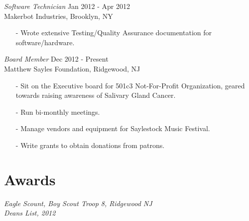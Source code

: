 \documentclass[margin, 10pt]{res} %
\begin{document}
\begin{resume}
{\sl Software Technician} \hfill Jan 2012 - Apr 2012 \\
Makerbot Industries, Brooklyn, NY
\begin{itemize} \itemsep -2pt
\item[-] Wrote extensive Testing/Quality Assurance documentation for software/hardware.
\end{itemize}

{\sl Board Member} \hfill Dec 2012 - Present \\
Matthew Sayles Foundation, Ridgewood, NJ
\begin{itemize} \itemsep -2pt
\item[-] Sit on the Executive board for 501c3 Not-For-Profit Organization, geared towards raising awareness of Salivary Gland Cancer.
\item[-] Run bi-monthly meetings.
\item[-] Manage vendors and equipment for Saylestock Music Festival.
\item[-] Write grants to obtain donations from patrons.
\end{itemize}


\section{Awards} 

{\sl Eagle Scount, Boy Scout Troop 8, Ridgewood NJ} \\
{\sl Deans List, 2012}

\end{resume}
\end{document}
